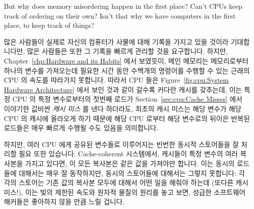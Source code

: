 But why does memory misordering happen in the first place?
Can't CPUs keep track of ordering on their own?
Isn't that why we have computers in the first place, to keep track of things?
\fi

많은 사람들이 실제로 자신의 컴퓨터가 사물에 대해 기록을 가지고 있을 것이라
기대합니다만, 많은 사람들은 또한 그 기록을 빠르게 관리할 것을 요구합니다.
하지만, Chapter~\ref{chp:Hardware and its Habits} 에서 보였듯이, 메인 메모리는
메모리로부터 하나의 변수를 가져오는데 필요한 시간 동안 수백개의 명령어를 수행할
수 있는 근래의 CPU 의 속도를 따라가지 못합니다.
따라서 CPU 들은
Figure~\ref{fig:cpu:System Hardware Architecture} 에서 보인 것과 같이
갈수록 커다란 캐시를 갖추는데, 이는 특정 CPU 의 특정 변수로부터의 첫번째 로드가
Section~\ref{sec:cpu:Cache Misses} 에서 이야기한 값비싼 \emph{캐시 미스} 를
낸다 하더라도, 최초의 캐시 미스는 해당 변수가 해당 CPU 의 캐시에 올라오게 하기
때문에 해당 CPU 로부터 해당 변수로의 뒤이은 반복된 로드들은 매우 빠르게
수행될 수도 있음을 의미합니다.

하지만, 여러 CPU 에게 공유된 변수들로 이루어지는 빈번한 동시적 스토어들을 잘
처리할 필요 또한 있습니다.
Cache-coherent 시스템에서, 캐시들이 특정 변수의 여러 복사본을 가지고 있다면, 이
모든 복사본은 같은 값을 가져야만 합니다.
이는 동시의 로드들에 대해서는 매우 잘 동작하지만, 동시의 스토어들에 대해서는
그렇지 못합니다:  각각의 스토어는 기존 값의 복사본 모두에 대해서 어떤 일을
해줘야 하는데 (또다른 캐시 미스!), 이는 빛의 제한된 속도와 원자적 물질의 원리를
놓고 보면, 성급한 소프트웨어 해커들은 좋아하지 않을 만큼 느릴 겁니다.

